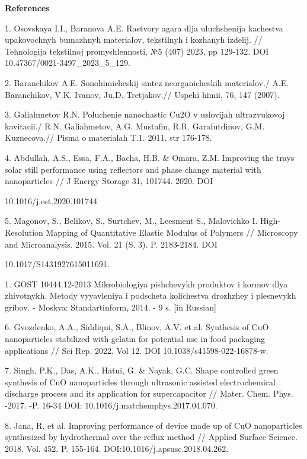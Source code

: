 \begin{center}
{\bfseries References}
\end{center}

\begin{noparindent}
1. Osovskaya I.I., Baranova A.E. Rastvory agara dlja uluchshenija
kachestva upakovochnyh bumazhnyh materialov,
tekstil\textquotesingle nyh i kozhanyh izdelij. // Tehnologija
tekstil\textquotesingle\textquotesingle noj promyshlennosti, №5 (407)
2023, pp 129-132. DOI 10.47367/0021-3497\_2023\_5\_129.

2. Baranchikov A.E. Sonohimicheskij sintez neorganicheskih materialov./
A.E. Baranchikov, V.K. Ivanov, Ju.D. Tret\textquotesingle jakov.//
Uspehi himii, 76, 147 (2007).

3. Galiahmetov R.N. Poluchenie nanochastic Cu2O v uslovijah
ul\textquotesingle trazvukovoj kavitacii./ R.N. Galiahmetov, A.G.
Mustafin, R.R. Garafutdinov, G.M. Kuznecova.// Pis\textquotesingle ma
o materialah T.1. 2011. str 176-178.

4. Abdullah, A.S., Essa, F.A., Bacha, H.B. \& Omara, Z.M. Improving the
trays solar still performance using reflectors and phase change
material with nanoparticles // J Energy Storage 31, 101744. 2020. DOI

10.1016/j.est.2020.101744

5. Magonov, S., Belikov, S., Surtchev, M., Leesment S., Malovichko I.
High-Resolution Mapping of Quantitative Elastic Modulus of Polymers //
Microscopy and Microanalysis. 2015. Vol. 21 (S. 3). P. 2183-2184. DOI

10.1017/S1431927615011691.

1. GOST 10444.12-2013 Mikrobiologiya pishchevykh produktov i kormov dlya
zhivotnykh. Metody vyyavleniya i podscheta kolichestva drozhzhey i
plesnevykh gribov. - Moskva: Standartinform, 2014. - 9 s. {[}in
Russian{]}

6. Gvozdenko, A.A., Siddiqui, S.A., Blinov, A.V. et al. Synthesis of CuO
nanoparticles stabilized with gelatin for potential use in food
packaging applications // Sci Rep. 2022. Vol 12. DOI
10.1038/s41598-022-16878-w.

7. Singh, P.K., Das, A.K., Hatui, G. \& Nayak, G.C. Shape controlled
green synthesis of CuO nanoparticles through ultrasonic assisted
electrochemical discharge process and its application for
supercapacitor // Mater. Chem. Phys. -2017. -P. 16-34 DOI:
10.1016/j.matchemphys.2017.04.070.

8. Jana, R. et al. Improving performance of device made up of CuO
nanoparticles synthesized by hydrothermal over the reflux method //
Applied Surface Science. 2018. Vol. 452. P. 155-164.
DOI:10.1016/j.apsusc.2018.04.262.


\end{noparindent}
